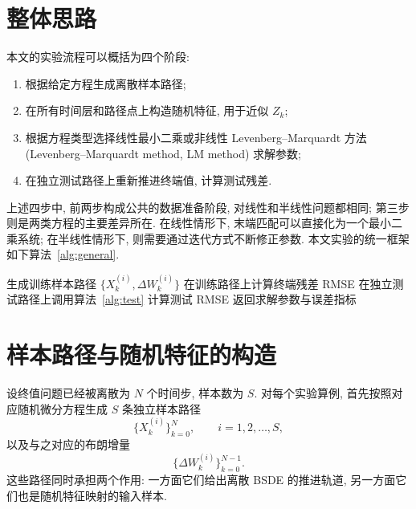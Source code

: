   \section{整体思路}\label{sec:overview}
    本文的实验流程可以概括为四个阶段:
    \begin{enumerate}
      \item 根据给定方程生成离散样本路径;
      \item 在所有时间层和路径点上构造随机特征, 用于近似 $Z_{k}$;
      \item 根据方程类型选择线性最小二乘或非线性 Levenberg--Marquardt 方法
      (Levenberg--Marquardt method, LM method) 求解参数;
      \item 在独立测试路径上重新推进终端值, 计算测试残差.
    \end{enumerate}

    上述四步中, 前两步构成公共的数据准备阶段, 对线性和半线性问题都相同;
    第三步则是两类方程的主要差异所在.
    在线性情形下, 末端匹配可以直接化为一个最小二乘系统;
    在半线性情形下, 则需要通过迭代方式不断修正参数.
    本文实验的统一框架如下算法~\ref{alg:general}.

    \begin{algorithm}[htbp]
      \SetAlgoLined
      生成训练样本路径 $\{X_{k}^{(i)}, \Delta W_k^{(i)}\}$\;
      在训练路径上计算终端残差 RMSE\;
      在独立测试路径上调用算法~\ref{alg:test} 计算测试 RMSE\;
      返回求解参数与误差指标\;
      \caption{统一实验框架}
      \label{alg:general}
    \end{algorithm}

  \section{样本路径与随机特征的构造}\label{sec:sampling}
    设终值问题已经被离散为 $N$ 个时间步, 样本数为 $S$.
    对每个实验算例, 首先按照对应随机微分方程生成 $S$ 条独立样本路径
    \begin{equation*}
      \{X_{k}^{(i)}\}_{k = 0}^{N}, \qquad i = 1,2,\dots,S,
    \end{equation*}
    以及与之对应的布朗增量
    \begin{equation*}
      \{\Delta W_{k}^{(i)}\}_{k = 0}^{N - 1}.
    \end{equation*}
    这些路径同时承担两个作用: 一方面它们给出离散 BSDE 的推进轨道,
    另一方面它们也是随机特征映射的输入样本.

